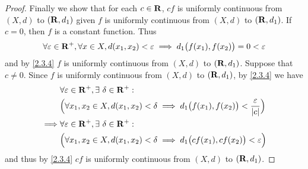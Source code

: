 \begin{proof}
  Finally we show that for each \(c \in \mathbf{R}\), \(cf\) is uniformly continuous from \((X, d)\) to \((\mathbf{R}, d_1)\) given \(f\) is uniformly continuous from \((X, d)\) to \((\mathbf{R}, d_1)\).
  If \(c = 0\), then \(f\) is a constant function.
  Thus
  \[
    \forall \varepsilon \in \mathbf{R}^+, \forall x \in X, d(x_1, x_2) < \varepsilon \implies d_1\big(f(x_1), f(x_2)\big) = 0 < \varepsilon
  \]
  and by \cref{2.3.4} \(f\) is uniformly continuous from \((X, d)\) to \((\mathbf{R}, d_1)\).
  Suppose that \(c \neq 0\).
  Since \(f\) is uniformly continuous from \((X, d)\) to \((\mathbf{R}, d_1)\), by \cref{2.3.4} we have
  \begin{align*}
             & \forall \varepsilon \in \mathbf{R}^+, \exists\ \delta \in \mathbf{R}^+:                                                                   \\
             & \Big(\forall x_1, x_2 \in X, d(x_1, x_2) < \delta \implies d_1\big(f(x_1), f(x_2)\big) < \frac{\varepsilon}{\left\lvert c\right\rvert}\Big) \\
    \implies & \forall \varepsilon \in \mathbf{R}^+, \exists\ \delta \in \mathbf{R}^+:                                                                   \\
             & \Big(\forall x_1, x_2 \in X, d(x_1, x_2) < \delta \implies d_1\big(cf(x_1), cf(x_2)\big) < \varepsilon\Big)
  \end{align*}
  and thus by \cref{2.3.4} \(cf\) is uniformly continuous from \((X, d)\) to \((\mathbf{R}, d_1)\).
\end{proof}